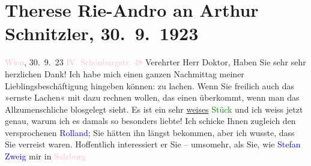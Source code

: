 

               \section[Therese Rie-Andro an Arthur Schnitzler, 30. 9. 1923]{ Therese Rie-Andro an Arthur Schnitzler, 30. 9. 1923}\nopagebreak{}\rehead{ }\normalsize\beginnumbering{} \toendnotes[C]{\smallbreak\pagebreak[2]} 
\toendnotes[C]{\smallbreak}\pstart
           \raggedleft{}{\pb}\textcolor{pink}{Wien}{}\ledrightnote{\textcolor{pink}{Wien}}, 30. 9. 23\pend
           \pstart
           \raggedleft{}\textcolor{pink}{IV. Schönburgstr. 48}{}\ledrightnote{\textcolor{pink}{Schönburgstraße}}\pend
           \pstart{}Verehrter Herr Doktor,\pend\pstart
           Haben Sie sehr sehr herzlichen Dank! Ich habe mich einen ganzen Nachmittag meiner
               Lieblingsbeschäftigung hingeben können: zu lachen. Wenn Sie freilich auch das »ernste
               Lachen« mit dazu rechnen wollen, das einen überkommt, wenn man das Allzumenschliche
               blosgelegt sieht. Es ist ein sehr \uline{weises}{ }\textcolor{green}{Stück}{} und ich weiss jetzt genau, warum ich es damals so besonders
               liebte!\pend
           \pstart
           Ich schicke Ihnen zugleich den versprochenen \textcolor{green}{\textcolor{blue}{Rolland}{}\ledrightnote{\textcolor{blue}{Romain Rolland}}}{}; Sie hätten ihn längst bekommen, aber ich wusste, dass Sie verreist waren.
               Hoffentlich interessiert er Sie – umsomehr, als Sie, wie \textcolor{blue}{Stefan Zweig}{}\ledrightnote{\textcolor{blue}{Stefan Zweig}} mir in \textcolor{pink}{Salzburg}{}\ledrightnote{\textcolor{pink}{Salzburg}}
